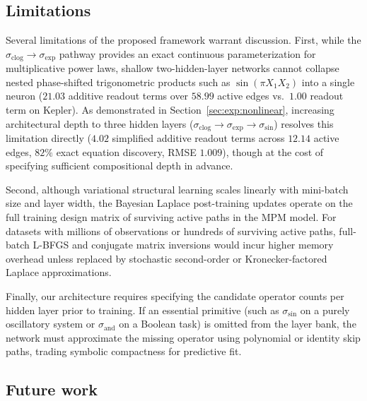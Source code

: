 \documentclass[11pt,a4paper]{article}
\begin{document}
\subsection{Limitations}
\label{sec:limitations}

Several limitations of the proposed framework warrant discussion. First, while the $\sigma_{\text{clog}} \to \sigma_{\exp}$ pathway provides an exact continuous parameterization for multiplicative power laws, shallow two-hidden-layer networks cannot collapse nested phase-shifted trigonometric products such as $\sin(\pi X_1 X_2)$ into a single neuron ($21.03$ additive readout terms over $58.99$ active edges vs.\ $1.00$ readout term on Kepler). As demonstrated in Section~\ref{sec:exp:nonlinear}, increasing architectural depth to three hidden layers ($\sigma_{\text{clog}} \to \sigma_{\exp} \to \sigma_{\sin}$) resolves this limitation directly ($4.02$ simplified additive readout terms across $12.14$ active edges, $82\%$ exact equation discovery, RMSE $1.009$), though at the cost of specifying sufficient compositional depth in advance.

Second, although variational structural learning scales linearly with mini-batch size and layer width, the Bayesian Laplace post-training updates operate on the full training design matrix of surviving active paths in the MPM model. For datasets with millions of observations or hundreds of surviving active paths, full-batch L-BFGS and conjugate matrix inversions would incur higher memory overhead unless replaced by stochastic second-order or Kronecker-factored Laplace approximations.

Finally, our architecture requires specifying the candidate operator counts per hidden layer prior to training. If an essential primitive (such as $\sigma_{\sin}$ on a purely oscillatory system or $\sigma_{\text{and}}$ on a Boolean task) is omitted from the layer bank, the network must approximate the missing operator using polynomial or identity skip paths, trading symbolic compactness for predictive fit.

\subsection{Future work}
\label{sec:future}
\end{document}
